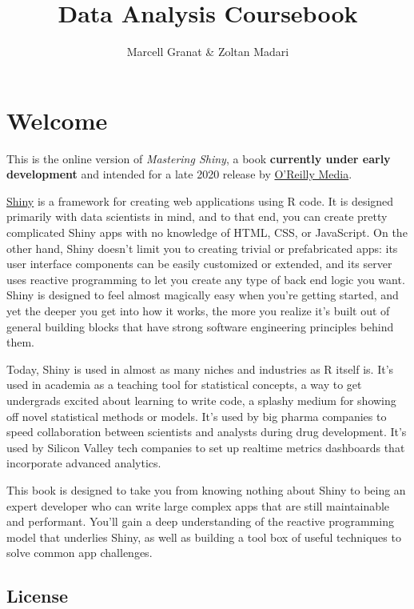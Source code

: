 \documentclass[
]{article}
\title{\textbf{Data Analysis} Coursebook}
\author{Marcell Granat \& Zoltan Madari}
\date{}
\begin{document}
\maketitle

{
\setcounter{tocdepth}{2}
\tableofcontents
}
\pagebreak

\hypertarget{welcome}{%
\section*{Welcome}\label{welcome}}

This is the online version of \emph{Mastering Shiny}, a book \textbf{currently under early development} and intended for a late 2020 release by \href{https://www.oreilly.com/}{O'Reilly Media}.

\href{https://shiny.rstudio.com/}{Shiny} is a framework for creating web applications using R code.
It is designed primarily with data scientists in mind, and to that end, you can create pretty complicated Shiny apps with no knowledge of HTML, CSS, or JavaScript.
On the other hand, Shiny doesn't limit you to creating trivial or prefabricated apps: its user interface components can be easily customized or extended, and its server uses reactive programming to let you create any type of back end logic you want.
Shiny is designed to feel almost magically easy when you're getting started, and yet the deeper you get into how it works, the more you realize it's built out of general building blocks that have strong software engineering principles behind them.

Today, Shiny is used in almost as many niches and industries as R itself is.
It's used in academia as a teaching tool for statistical concepts, a way to get undergrads excited about learning to write code, a splashy medium for showing off novel statistical methods or models.
It's used by big pharma companies to speed collaboration between scientists and analysts during drug development.
It's used by Silicon Valley tech companies to set up realtime metrics dashboards that incorporate advanced analytics.

This book is designed to take you from knowing nothing about Shiny to being an expert developer who can write large complex apps that are still maintainable and performant.
You'll gain a deep understanding of the reactive programming model that underlies Shiny, as well as building a tool box of useful techniques to solve common app challenges.

\hypertarget{license}{%
\subsection*{License}\label{license}}
\end{document}
